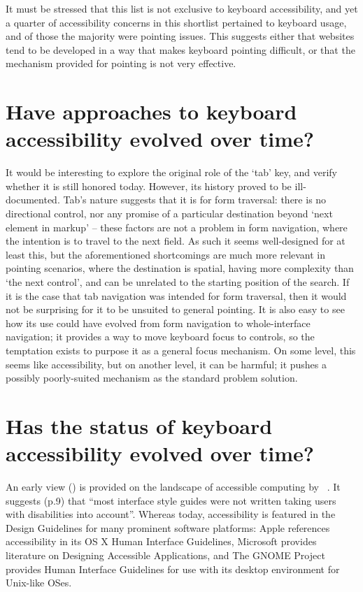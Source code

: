 \documentclass[11pt,openright,a4paper]{report}
\begin{document}
It must be stressed that this list is not exclusive to keyboard accessibility, and yet a quarter of accessibility concerns in this shortlist pertained to keyboard usage, and of those the majority were pointing issues. This suggests either that websites tend to be developed in a way that makes keyboard pointing difficult, or that the mechanism provided for pointing is not very effective.
\section{Have approaches to keyboard accessibility evolved over time?}
It would be interesting to explore the original role of the `tab' key, and verify whether it is still honored today. However, its history proved to be ill-documented. Tab's nature suggests that it is for form traversal: there is no directional control, nor any promise of a particular destination beyond `next element in markup' -- these factors are not a problem in form navigation, where the intention is to travel to the next field. As such it seems well-designed for at least this, but the aforementioned shortcomings are much more relevant in pointing scenarios, where the destination is spatial, having more complexity than `the next control', and can be unrelated to the starting position of the search.
If it is the case that tab navigation was intended for form traversal, then it would not be surprising for it to be unsuited to general pointing. It is also easy to see how its use could have evolved from form navigation to whole-interface navigation; it provides a way to move keyboard focus to controls, so the temptation exists to purpose it as a general focus mechanism. On some level, this seems like accessibility, but on another level, it can be harmful; it pushes a possibly poorly-suited mechanism as the standard problem solution.
\section{Has the status of keyboard accessibility evolved over time?}
\label{a11yevolution}
An early view (\citeyear{bergman1995towards}) is provided on the landscape of accessible computing by \citeauthor{bergman1995towards}~\cite{bergman1995towards}. It suggests (p.9) that ``most interface style guides were not written taking users with disabilities into account''. Whereas today, accessibility is featured in the Design Guidelines for many prominent software platforms: Apple references accessibility in its OS X Human Interface Guidelines\cite{applehig}, Microsoft provides literature on Designing Accessible Applications\cite{microsofthig}, and The GNOME Project provides Human Interface Guidelines for use with its desktop environment for Unix-like OSes\cite{gnomehig}.
\end{document}
